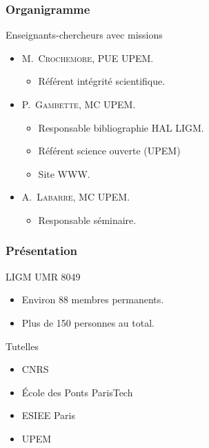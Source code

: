 \documentclass[]{beamer}
\begin{document}
\begin{frame}
  \frametitle{Organigramme}

  \begin{block}{Enseignants-chercheurs avec missions}
    \begin{itemize}
      \item \textsc{M.~Crochemore}, PUE UPEM.
        \begin{itemize}
          \item Référent intégrité scientifique.
        \end{itemize}
      \item \textsc{P.~Gambette}, MC UPEM.
      \begin{itemize}
        \item Responsable bibliographie HAL LIGM.
        \item Référent science ouverte (UPEM)
        \item Site WWW.
      \end{itemize}
      \item \textsc{A.~Labarre}, MC UPEM.
      \begin{itemize}
        \item Responsable séminaire.
      \end{itemize}
    \end{itemize}
  \end{block}

\end{frame}


\begin{frame}
  \frametitle{Présentation}

  \begin{block}{LIGM UMR 8049}
    \begin{itemize}
      \item Environ 88 membres permanents.
      \item Plus de 150 personnes au total.
    \end{itemize}
  \end{block}

  \begin{block}{Tutelles}
    \begin{itemize}
      \item
      CNRS

      \item
      \'Ecole des Ponts ParisTech

      \item
      ESIEE Paris

      \item
      UPEM
    \end{itemize}
  \end{block}

\end{frame}
\end{document}
